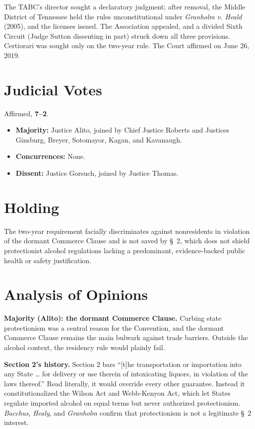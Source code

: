 \documentclass[12pt]{article}
\begin{document}
The TABC's director sought a declaratory judgment; after removal, the Middle District of Tennessee held the rules unconstitutional under \textit{Granholm v. Heald} (2005), and the licenses issued. The Association appealed, and a divided Sixth Circuit (Judge Sutton dissenting in part) struck down all three provisions. Certiorari was sought only on the two-year rule. The Court affirmed on June 26, 2019.

\section{Judicial Votes}

Affirmed, \textbf{7--2}.
\begin{itemize}
\item \textbf{Majority:} Justice Alito, joined by Chief Justice Roberts and Justices Ginsburg, Breyer, Sotomayor, Kagan, and Kavanaugh.
\item \textbf{Concurrences:} None.
\item \textbf{Dissent:} Justice Gorsuch, joined by Justice Thomas.
\end{itemize}

\section{Holding}

The two-year requirement facially discriminates against nonresidents in violation of the dormant Commerce Clause and is not saved by \S~2, which does not shield protectionist alcohol regulations lacking a predominant, evidence-backed public health or safety justification.

\section{Analysis of Opinions}

\textbf{Majority (Alito): the dormant Commerce Clause.} Curbing state protectionism was a central reason for the Convention, and the dormant Commerce Clause remains the main bulwark against trade barriers. Outside the alcohol context, the residency rule would plainly fail.

\textbf{Section 2's history.} Section 2 bars ``[t]he transportation or importation into any State \ldots{} for delivery or use therein of intoxicating liquors, in violation of the laws thereof.'' Read literally, it would override every other guarantee. Instead it constitutionalized the Wilson Act and Webb-Kenyon Act, which let States regulate imported alcohol on equal terms but never authorized protectionism. \textit{Bacchus}, \textit{Healy}, and \textit{Granholm} confirm that protectionism is not a legitimate \S~2 interest.
\end{document}
